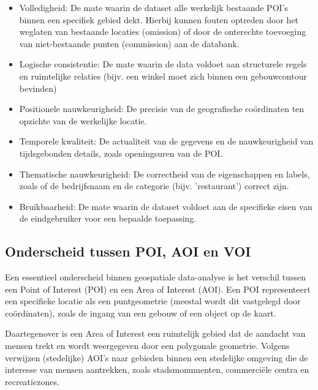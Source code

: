 \begin{itemize}
    \item Volledigheid: De mate waarin de dataset alle werkelijk bestaande POI's binnen een specifiek gebied dekt. Hierbij kunnen fouten optreden door het weglaten van bestaande locaties (omission) of door de onterechte toevoeging van niet-bestaande punten (commission) aan de databank.
    
    \item Logische consistentie: De mate waarin de data voldoet aan structurele regels en ruimtelijke relaties (bijv. een winkel moet zich binnen een gebouwcontour bevinden)
    
    \item Positionele nauwkeurigheid: De precisie van de geografische coördinaten ten opzichte van de werkelijke locatie.
    
    \item Temporele kwaliteit: De actualiteit van de gegevens en de nauwkeurigheid van tijdsgebonden details, zoals openingsuren van de POI.
    
    \item Thematische nauwkeurigheid: De correctheid van de eigenschappen en labels, zoals of de bedrijfsnaam en de categorie (bijv. 'restaurant') correct zijn.
    
    \item Bruikbaarheid: De mate waarin de dataset voldoet aan de specifieke eisen van de eindgebruiker voor een bepaalde toepassing. 
    
\end{itemize}

\subsection{Onderscheid tussen POI, AOI en VOI}

Een essentieel onderscheid binnen geospatiale data-analyse is het verschil tussen een Point of Interest (POI) en een Area of Interest (AOI). Een POI representeert een specifieke locatie als een puntgeometrie (meestal wordt dit vastgelegd door coördinaten), zoals de ingang van een gebouw of een object op de kaart. 

Daartegenover is een Area of Interest een ruimtelijk gebied dat de aandacht van mensen trekt en wordt weergegeven door een polygonale geometrie. Volgens \textcite{Hu2015} verwijzen (stedelijke) AOI’s naar gebieden binnen een stedelijke omgeving die de interesse van mensen aantrekken, zoals stadsmonumenten, commerciële centra en recreatiezones.

